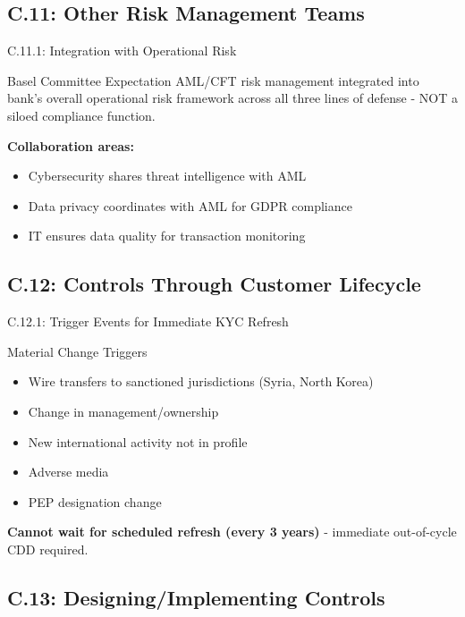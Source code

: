 \documentclass{beamer}
\begin{document}
	\subsection{C.11: Other Risk Management Teams}
	
	\begin{frame}{C.11.1: Integration with Operational Risk}
		\begin{block}{Basel Committee Expectation}
			AML/CFT risk management integrated into bank's overall operational risk framework across all three lines of defense - NOT a siloed compliance function.
		\end{block}
		\textbf{Collaboration areas:}
		\begin{itemize}
			\item Cybersecurity shares threat intelligence with AML
			\item Data privacy coordinates with AML for GDPR compliance
			\item IT ensures data quality for transaction monitoring
		\end{itemize}
	\end{frame}
	
	\subsection{C.12: Controls Through Customer Lifecycle}
	
	\begin{frame}{C.12.1: Trigger Events for Immediate KYC Refresh}
		\begin{block}{Material Change Triggers}
			\begin{itemize}
				\item Wire transfers to sanctioned jurisdictions (Syria, North Korea)
				\item Change in management/ownership
				\item New international activity not in profile
				\item Adverse media
				\item PEP designation change
			\end{itemize}
		\end{block}
		\textbf{Cannot wait for scheduled refresh (every 3 years)} - immediate out-of-cycle CDD required.
	\end{frame}
	
	\subsection{C.13: Designing/Implementing Controls}
	
\end{document}
